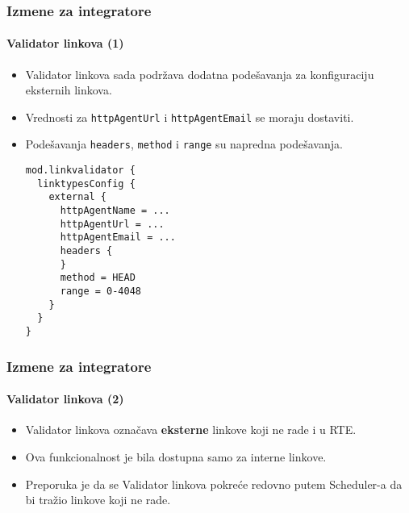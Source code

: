 
\begin{frame}[fragile]
	\frametitle{Izmene za integratore}
	\framesubtitle{Validator linkova (1)}

	\lstset{basicstyle=\tiny\ttfamily}

	\begin{itemize}
		\item Validator linkova sada podržava dodatna podešavanja za konfiguraciju eksternih linkova.
		\item Vrednosti za \texttt{httpAgentUrl} i \texttt{httpAgentEmail} se moraju dostaviti.
		\item Podešavanja \texttt{headers}, \texttt{method} i \texttt{range} su napredna podešavanja.
\begin{lstlisting}
mod.linkvalidator {
  linktypesConfig {
    external {
      httpAgentName = ...
      httpAgentUrl = ...
      httpAgentEmail = ...
      headers {
      }
      method = HEAD
      range = 0-4048
    }
  }
}
\end{lstlisting}

	\end{itemize}

\end{frame}


\begin{frame}[fragile]
	\frametitle{Izmene za integratore}
	\framesubtitle{Validator linkova (2)}

	\begin{itemize}
		\item Validator linkova označava \textbf{eksterne} linkove koji ne rade i u RTE.
		\item Ova funkcionalnost je bila dostupna samo za interne linkove.
		\item Preporuka je da se Validator linkova pokreće redovno putem Scheduler-a da bi tražio linkove koji ne rade.
	\end{itemize}

\end{frame}

